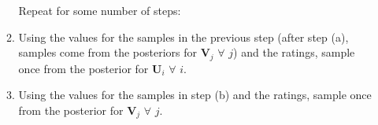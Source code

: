 \documentclass[submit]{harvardml}
\theoremstyle{plain}
\begin{document}
\begin{enumerate}[label=3.\arabic*.]
\begin{enumerate}
Repeat for some number of steps:
\item Using the values for the samples in the previous step (after step (a), samples come from the posteriors for $\mathbf{V}_j$ $\forall$ $j$) and the ratings, sample once from the posterior for $\mathbf{U}_i$ $\forall$ $i$.
\item Using the values for the samples in step (b) and the ratings, sample once from the posterior for $\mathbf{V}_j$ $\forall$ $j$.
\end{enumerate}
\end{enumerate}
\end{document}
